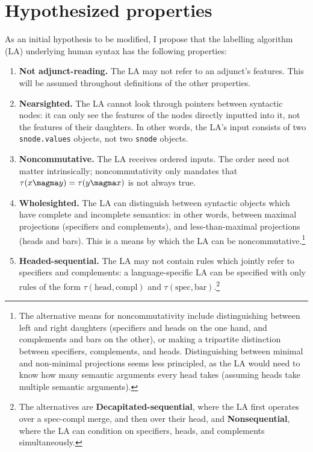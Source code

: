 
\section{Hypothesized properties}

As an initial hypothesis to be modified, I propose that the labelling algorithm (LA) underlying human syntax has the following properties:


\begin{enumerate}
    \item \textbf{Not adjunct-reading.} The LA may not refer to an adjunct's features. This will be assumed throughout definitions of the other properties. 

    \item \textbf{Nearsighted.} The LA cannot look through pointers between syntactic nodes: it can only see the features of the nodes directly inputted into it, not the features of their daughters. In other words, the LA's input consists of two \texttt{snode.values{}} objects, not two \texttt{snode} objects.

    \item \textbf{Noncommutative.} The LA receives ordered inputs. The order need not matter intrinsically; noncommutativity only mandates that $\tau (x \magma y) = \tau(y \magma x)$ is not always true. 

    \item \textbf{Wholesighted.} The LA can distinguish between syntactic objects which have complete and incomplete semantics: in other words, between maximal projections (specifiers and complements), and less-than-maximal projections (heads and bars). This is a means by which the LA can be noncommutative.\footnote{The alternative means for noncommutativity include distinguishing between left and right daughters (specifiers and heads on the one hand, and complements and bars on the other), or making a tripartite distinction between specifiers, complements, and heads. Distinguishing between minimal and non-minimal projections seems less principled, as the LA would need to know how many semantic arguments every head takes (assuming heads take multiple semantic arguments).}

    \item \textbf{Headed-sequential.} The LA may not contain rules which jointly refer to specifiers and complements: a language-specific LA can be specified with only rules of the form $\tau(\text{head}, \text{compl})$ and $\tau(\text{spec}, \text{bar})$.\footnote{The alternatives are \textbf{Decapitated-sequential}, where the LA first operates over a spec-compl merge, and then over their head, and \textbf{Nonsequential}, where the LA can condition on specifiers, heads, and complements simultaneously.}


\end{enumerate}
